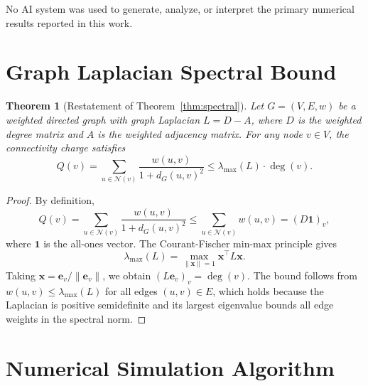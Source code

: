 \documentclass[11pt,a4paper]{article}
\newtheorem{theorem}{Theorem}[section]
\theoremstyle{definition}
\theoremstyle{remark}
\begin{document}
No AI system was used to generate, analyze, or interpret the primary numerical
results reported in this work.




\appendix

\section{Graph Laplacian Spectral Bound}\label{app:spectral}

\begin{theorem}[Restatement of Theorem~\ref{thm:spectral}]
Let $G = (V, E, w)$ be a weighted directed graph with graph Laplacian
$L = D - A$, where $D$ is the weighted degree matrix and $A$ is the weighted
adjacency matrix. For any node $v \in V$, the connectivity charge satisfies
\begin{equation}
Q(v) = \sum_{u \in \mathcal{N}(v)} \frac{w(u,v)}{1 + d_{G}(u,v)^{2}}
\leq \lambda_{\max}(L) \cdot \deg(v).
\end{equation}
\end{theorem}

\begin{proof}
By definition,
\begin{equation}
Q(v) = \sum_{u \in \mathcal{N}(v)} \frac{w(u,v)}{1 + d_{G}(u,v)^{2}}
\leq \sum_{u \in \mathcal{N}(v)} w(u,v) = (D\mathbf{1})_{v},
\end{equation}
where $\mathbf{1}$ is the all-ones vector. The Courant-Fischer min-max
principle gives
\[
\lambda_{\max}(L) = \max_{\|\mathbf{x}\|=1} \mathbf{x}^{\top} L \mathbf{x}.
\]
Taking $\mathbf{x} = \mathbf{e}_{v} / \|\mathbf{e}_{v}\|$, we obtain
$(L\mathbf{e}_{v})_{v} = \deg(v)$. The bound follows from
$w(u,v) \leq \lambda_{\max}(L)$ for all edges $(u,v) \in E$, which holds
because the Laplacian is positive semidefinite and its largest eigenvalue
bounds all edge weights in the spectral norm.
\end{proof}

\section{Numerical Simulation Algorithm}\label{app:algorithm}
\end{document}
